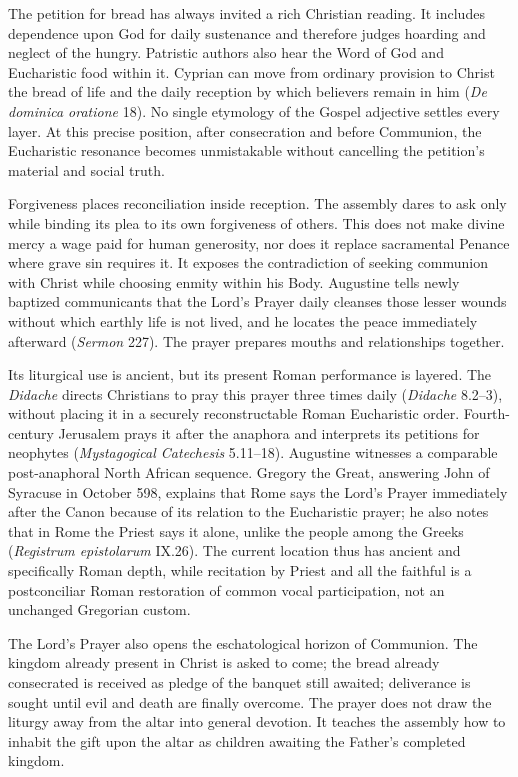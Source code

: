 The petition for bread has always invited a rich Christian reading. It includes dependence upon God for daily sustenance and therefore judges hoarding and neglect of the hungry. Patristic authors also hear the Word of God and Eucharistic food within it. Cyprian can move from ordinary provision to Christ the bread of life and the daily reception by which believers remain in him (\emph{De dominica oratione} 18). No single etymology of the Gospel adjective settles every layer. At this precise position, after consecration and before Communion, the Eucharistic resonance becomes unmistakable without cancelling the petition's material and social truth.

Forgiveness places reconciliation inside reception. The assembly dares to ask only while binding its plea to its own forgiveness of others. This does not make divine mercy a wage paid for human generosity, nor does it replace sacramental Penance where grave sin requires it. It exposes the contradiction of seeking communion with Christ while choosing enmity within his Body. Augustine tells newly baptized communicants that the Lord's Prayer daily cleanses those lesser wounds without which earthly life is not lived, and he locates the peace immediately afterward (\emph{Sermon} 227). The prayer prepares mouths and relationships together.

Its liturgical use is ancient, but its present Roman performance is layered. The \emph{Didache} directs Christians to pray this prayer three times daily (\emph{Didache} 8.2--3), without placing it in a securely reconstructable Roman Eucharistic order. Fourth-century Jerusalem prays it after the anaphora and interprets its petitions for neophytes (\emph{Mystagogical Catechesis} 5.11--18). Augustine witnesses a comparable post-anaphoral North African sequence. Gregory the Great, answering John of Syracuse in October 598, explains that Rome says the Lord's Prayer immediately after the Canon because of its relation to the Eucharistic prayer; he also notes that in Rome the Priest says it alone, unlike the people among the Greeks (\emph{Registrum epistolarum} IX.26). The current location thus has ancient and specifically Roman depth, while recitation by Priest and all the faithful is a postconciliar Roman restoration of common vocal participation, not an unchanged Gregorian custom.

The Lord's Prayer also opens the eschatological horizon of Communion. The kingdom already present in Christ is asked to come; the bread already consecrated is received as pledge of the banquet still awaited; deliverance is sought until evil and death are finally overcome. The prayer does not draw the liturgy away from the altar into general devotion. It teaches the assembly how to inhabit the gift upon the altar as children awaiting the Father's completed kingdom.

